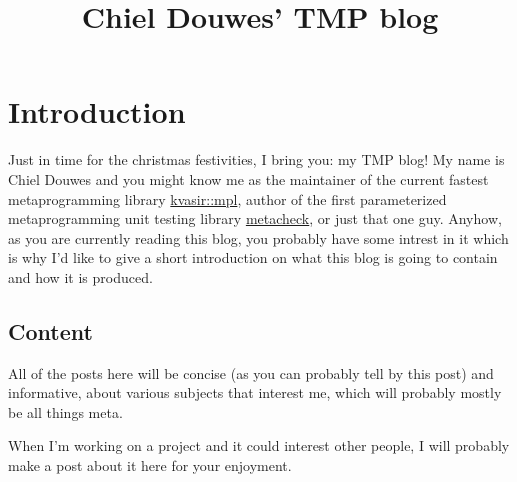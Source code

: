 \documentclass{article}
\title{Chiel Douwes' TMP blog}
\date{}
\providecommand{\post}[2]{\HCode{<hr>}\Link{#2}{#2}\section{#1}\EndLink}
\begin{document}
\maketitle


\post{Introduction}{intro}
Just in time for the christmas festivities, I bring you: my TMP blog!
My name is Chiel Douwes and you might know me as the maintainer of the current fastest
metaprogramming library \href{https://github.com/kvasir-io/mpl}{kvasir::mpl}, author of the first
parameterized metaprogramming unit testing library \href{https://github.com/chieltbest/metacheck}{metacheck},
or just that one guy. Anyhow, as you are currently reading
this blog, you probably have some intrest in it which is why I'd like to give a short
introduction on what this blog is going to contain and how it is produced.

\subsection*{Content}
All of the posts here will be concise (as you can probably tell by this post) and informative,
about various subjects that interest me, which will probably mostly be all things meta.
\begin{comment}
In fact, this first post is in essence a meta-post
\end{comment}
When I'm working on a project and it could interest other people, I will probably make a post
about it here for your enjoyment.
\begin{comment}
Of which there already are several subjects lined up
\end{comment}
\end{document}
